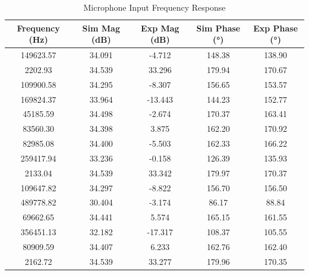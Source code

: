 \documentclass[12pt]{article}
\begin{document}
\begin{table}[H]
	\centering
	\caption{Microphone Input Frequency Response}
	\renewcommand{\arraystretch}{1.3}
	\begin{tabular}{|c|c|c|c|c|}
		\hline
		\textbf{Frequency (Hz)} & \textbf{Sim Mag (dB)} & \textbf{Exp Mag (dB)} & \textbf{Sim Phase (°)} & \textbf{Exp Phase (°)} \\ \hline
		149623.57               & 34.091                & -4.712                & 148.38                 & 138.90                 \\ \hline
		2202.93                 & 34.539                & 33.296                & 179.94                 & 170.67                 \\ \hline
		109900.58               & 34.295                & -8.307                & 156.65                 & 153.57                 \\ \hline
		169824.37               & 33.964                & -13.443               & 144.23                 & 152.77                 \\ \hline
		45185.59                & 34.498                & -2.674                & 170.37                 & 163.41                 \\ \hline
		83560.30                & 34.398                & 3.875                 & 162.20                 & 170.92                 \\ \hline
		82985.08                & 34.400                & -5.503                & 162.33                 & 166.22                 \\ \hline
		259417.94               & 33.236                & -0.158                & 126.39                 & 135.93                 \\ \hline
		2133.04                 & 34.539                & 33.342                & 179.97                 & 170.37                 \\ \hline
		109647.82               & 34.297                & -8.822                & 156.70                 & 156.50                 \\ \hline
		489778.82               & 30.404                & -3.174                & 86.17                  & 88.84                  \\ \hline
		69662.65                & 34.441                & 5.574                 & 165.15                 & 161.55                 \\ \hline
		356451.13               & 32.182                & -17.317               & 108.37                 & 105.55                 \\ \hline
		80909.59                & 34.407                & 6.233                 & 162.76                 & 162.40                 \\ \hline
		2162.72                 & 34.539                & 33.277                & 179.96                 & 170.35                 \\ \hline
	\end{tabular}
	\label{tab:mic_response}
\end{table}
\end{document}
